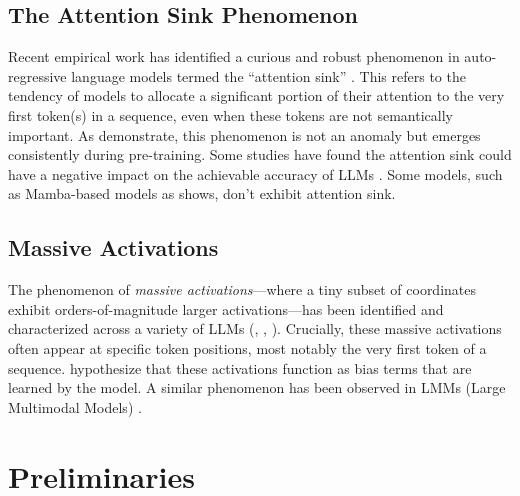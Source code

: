 \documentclass[11pt]{article}
\newif\ifResolvedcomments
\newcommand{\Resolved}[1]{\ifResolvedcomments\textcolor{green}{[Resolved: #1]}\fi}
\begin{document}
\subsection{The Attention Sink Phenomenon}
Recent empirical work has identified a curious and robust phenomenon in auto-regressive language models termed the ``attention sink'' \cite{xiao2023efficient}. This refers to the tendency of models to allocate a significant portion of their attention to the very first token(s) in a sequence, even when these tokens are not semantically important. As \cite{gu2025when} demonstrate, this phenomenon is not an anomaly but emerges consistently during pre-training. Some studies have found the attention sink could have a negative impact on the achievable accuracy of LLMs \cite{Yu2024Unveiling}. Some models, such as Mamba-based models as \citet{endy-etal-2025-mamba} shows, don't exhibit attention sink. \Resolved{When working on this part, please make sure to cite my paper (attention knockout), it related to this paper because there we show that Mamba-based models don't have an attention sink so we can cite it as papers showing that some architecture don't suffer from attention sink (it's common practice  to forcibly cite yourself haha)}

\subsection{Massive Activations}
The phenomenon of \emph{massive activations}—where a tiny subset of coordinates exhibit orders-of-magnitude larger activations—has been identified and characterized across a variety of LLMs (\cite{sun2024massive}, \cite{lindnielsen2024spectral}, \cite{lin2024duquant}). Crucially, these massive activations often appear at specific token positions, most notably the very first token of a sequence. \cite{sun2024massive} hypothesize that these activations function as bias terms that are learned by the model. A similar phenomenon has been observed in LMMs (Large Multimodal Models) \cite{Kang2025See}.


\section{Preliminaries}
\end{document}
